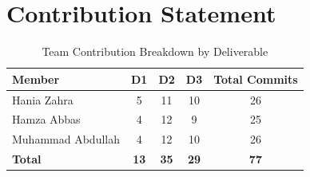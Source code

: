 \documentclass[10pt,journal,compsoc]{IEEEtran}
\begin{document}
\section{Contribution Statement}
\begin{table}[h]
\centering
\caption{Team Contribution Breakdown by Deliverable}
\label{tab:contributions}
\begin{tabular}{lcccc}
\toprule
\textbf{Member} & \textbf{D1} & \textbf{D2} & \textbf{D3} & \textbf{Total Commits} \\
\midrule
Hania Zahra & 5 & 11 & 10 & 26 \\
Hamza Abbas & 4 & 12 & 9 & 25 \\
Muhammad Abdullah & 4 & 12 & 10 & 26 \\
\midrule
\textbf{Total} & \textbf{13} & \textbf{35} & \textbf{29} & \textbf{77} \\
\bottomrule
\end{tabular}
\end{table}



\end{document}
